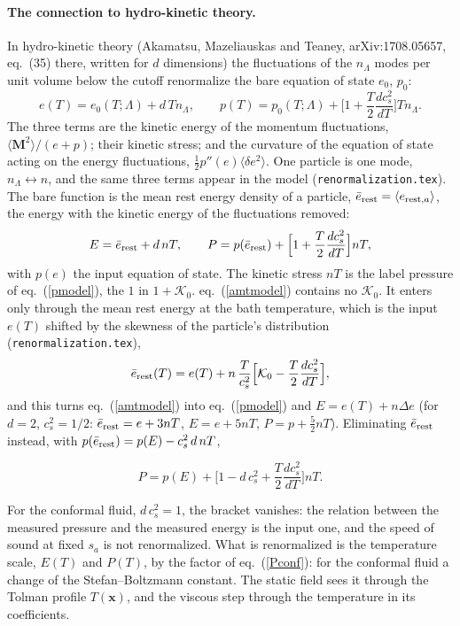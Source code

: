 \documentclass[11pt,aps,preprint,nofootinbib,superscriptaddress,tightenlines]{revtex4-2}
\newcommand{\avg}[1]{\langle #1\rangle}
\def\st{\begin{equation}}
\def\stp{\end{equation}}
\def\Eq#1{eq.~(\ref{#1})}
\let\oldparagraph\paragraph
\renewcommand{\paragraph}{\par\bigskip\oldparagraph}
\begin{document}
\paragraph{The connection to hydro-kinetic theory.}  In hydro-kinetic theory (Akamatsu, Mazeliauskas and Teaney, arXiv:1708.05657, eq.~(35) there,
written for $d$ dimensions) the fluctuations of the $n_\Lambda$ modes per unit volume below the cutoff renormalize the bare equation of state $e_0$, $p_0$:
\st
e(T)=e_0(T;\Lambda)+d\,Tn_\Lambda,\qquad p(T)=p_0(T;\Lambda)+\Big[1+\frac T2\frac{dc_s^2}{dT}\Big]Tn_\Lambda .
\label{amt35}
\stp
The three terms are the kinetic energy of the momentum fluctuations, $\avg{\bm M^2}/(e+p)$; their kinetic stress; and the curvature of the equation of state
acting on the energy fluctuations, $\tfrac12p''(e)\avg{\delta e^2}$.  One particle is one mode, $n_\Lambda\leftrightarrow n$, and the same three terms appear in the
model (\texttt{renormalization.tex}).  The bare function is the mean rest energy density of a particle, $\bar e_{\rm rest}=\avg{e_{{\rm rest},a}}$, the energy
with the kinetic energy of the fluctuations removed:
\st
E=\bar e_{\rm rest}+d\,nT,\qquad P=p(\bar e_{\rm rest})+\Big[1+\frac T2\frac{dc_s^2}{dT}\Big]nT ,
\label{amtmodel}
\stp
with $p(e)$ the input equation of state.  The kinetic stress $nT$ is the label pressure of \Eq{pmodel}, the $1$ in $1+\mathcal K_0$.  \Eq{amtmodel} contains no
$\mathcal K_0$.  It enters only through the mean rest energy at the bath temperature, which is the input $e(T)$ shifted by the skewness of the particle's
distribution (\texttt{renormalization.tex}),
\st
\bar e_{\rm rest}(T)=e(T)+n\,\frac T{c_s^2}\Big[\mathcal K_0-\frac T2\frac{dc_s^2}{dT}\Big] ,
\stp
and this turns \Eq{amtmodel} into \Eq{pmodel} and $E=e(T)+n\Delta e$ (for $d=2$, $c_s^2=1/2$: $\bar e_{\rm rest}=e+3nT$, $E=e+5nT$, $P=p+\tfrac52nT$).
Eliminating $\bar e_{\rm rest}$ instead, with $p(\bar e_{\rm rest})=p(E)-c_s^2\,d\,nT$,
\begin{keyeq}
\st
P=p(E)+\Big[1-d\,c_s^2+\frac T2\frac{dc_s^2}{dT}\Big]nT .
\label{PofE}
\stp
\end{keyeq}
For the conformal fluid, $d\,c_s^2=1$, the bracket vanishes: the relation between the measured pressure and the measured energy is the input one, and the speed
of sound at fixed $s_a$ is not renormalized.  What is renormalized is the temperature scale, $E(T)$ and $P(T)$, by the factor of \Eq{Pconf}: for the conformal
fluid a change of the Stefan--Boltzmann constant.  The static field sees it through the Tolman profile $T(\bm x)$, and the viscous step through the temperature in its
coefficients.
\end{document}
